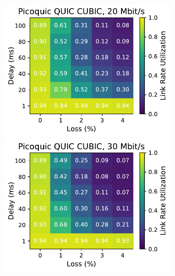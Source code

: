 \begin{figure}[ht]
\begin{subfigure}[b]{0.22\linewidth}
        \includegraphics[width=\linewidth,trim={0 0 2cm 0},clip]{splitting/figures/heatmaps/heatmap_picoquic_cubic_20mbps.pdf}
        \includegraphics[width=\linewidth,trim={0 0 2cm 0},clip]{splitting/figures/heatmaps/heatmap_picoquic_cubic_30mbps.pdf}

\end{subfigure}
\end{figure}
